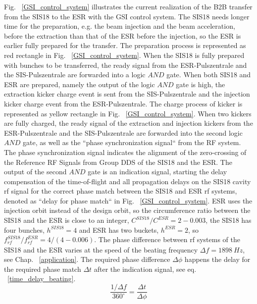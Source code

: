 Fig. ~\ref{GSI_control_system} illustrates the current realization of the B2B transfer from the SIS18 to the ESR with the GSI control system. The SIS18 needs longer time for the preparation, e.g. the beam injection and the beam acceleration, before the extraction than that of the ESR before the injection, so the ESR is earlier fully prepared for the transfer. The preparation process is represented as red rectangle in Fig. ~\ref{GSI_control_system}. When the SIS18 is fully prepared with bunches to be transferred, the ready signal from the ESR-Pulszentrale and the SIS-Pulszentrale are forwarded into a logic $\textit{AND}$ gate. When both SIS18 and ESR are prepared, namely the output of the logic $\textit{AND}$ gate is high, the extraction kicker charge event is sent from the SIS-Pulszentrale and the injection kicker charge event from the ESR-Pulszentrale. The charge process of kicker is represented as yellow rectangle in Fig. ~\ref{GSI_control_system}. When two kickers are fully charged, the ready signal of the extraction and injection kickers from the ESR-Pulszentrale and the SIS-Pulszentrale are forwarded into the second logic $\textit{AND}$ gate, as well as the ``phase synchronization signal`` from the RF system. The phase synchronization signal indicates the alignment of the zero-crossing of the Reference RF Signals from Group DDS of the SIS18 and the ESR. The output of the second $\textit{AND}$ gate is an indication signal, starting the delay compensation of the time-of-flight and all propagation delays on the SIS18 cavity rf signal for the correct phase match between the SIS18 and ESR rf systems, denoted as ``delay for phase match`` in Fig. ~\ref{GSI_control_system}. ESR uses the injection orbit instead of the design orbit, so the circumference ratio between the SIS18 and the ESR is close to an integer, $C^{\mathit{SIS18}}/C^{\mathit{ESR}}=2-0.003$, the SIS18 has four bunches, $h^{\mathit{SIS18}}=4$ and ESR has two buckets, $h^{\mathit{ESR}}=2$, so $f^{\mathit{SIS18}}_{\mathit{rf}}/f^{\mathit{ESR}}_{\mathit{rf}}=4/(4-0.006)$. The phase difference between rf systems of the SIS18 and the ESR varies at the speed of the beating frequency $\Delta f=\SI{1898}{Hz}$, see Chap. ~\ref{application}. The required phase difference $\Delta\phi$ happens the delay for the required phase match $\Delta t$ after the indication signal, see eq. ~\ref{time_delay_beating}. 
\begin{equation}
\frac{1/\Delta f}{360^\circ} = \frac{\Delta t}{\Delta \phi}\label{time_delay_beating}
\end{equation}

